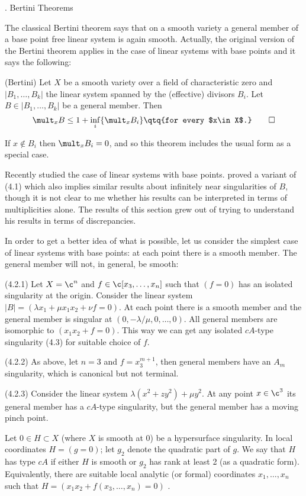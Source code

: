 . Bertini Theorems
\endhead


The classical Bertini theorem says that  on a smooth variety a general
member of a base point free linear system is again smooth.  Actually,  the
original version of the Bertini theorem applies in the case of linear systems
with base points and it says the following:

 (Bertini) Let $X$ be a smooth variety over a field of
characteristic zero and $|B_1,\dots,B_k|$ the linear system spanned by the
(effective) divisors $B_i$. Let $B\in |B_1,\dots,B_k|$ be a general member.
Then  
$$
\mult_xB\leq 1+\inf_i\{\mult_xB_i\}\qtq{for every $x\in X$.}\qed
$$
\endproclaim

If $x\not\in B_i$ then $\mult_xB_i=0$, and so this theorem includes the usual
form as a special case. 

Recently
\cite{Xu94} studied the case of linear systems with base points.
\cite{Xu94} proved a variant of (4.1)  which also  implies similar results about
infinitely near singularities of $B$, though it is not clear to me whether his
results can be interpreted in terms of multiplicities alone. 
The results of this section grew out of trying to understand his results in
terms of discrepancies.

In order to get a better idea of what is possible, let us consider the simplest
case  of linear systems with base points: at each point there is a smooth
member. The general member will not, in general, be smooth:


 (4.2.1) Let $X=\c^n$ and $f\in \c[x_3,\dots,x_n]$
such that    $(f=0)$ has an isolated singularity at
the origin. Consider the linear system $|B|=(\lambda x_1+\mu x_1x_2+
\nu f=0)$. At each point there is a smooth
member and the general member is
singular at 
$(0,-\lambda/\mu,0,\dots,0)$. All general members are isomorphic to 
$(x_1x_2+f=0)$. 
This way we can get any isolated $cA$-type singularity (4.3) for suitable choice
of
 $f$.

(4.2.2) As above, let $n=3$ and $f=x_3^{m+1}$, then general members have an
$A_m$ singularity, which is canonical but not terminal.

(4.2.3)  Consider the linear system $\lambda(x^2+zy^2)+\mu y^2$. At any point
$x\in \c^3$ its general member has a $cA$-type singularity, but the general
member has a moving pinch point. 
\enddemo




 Let $0\in H\subset
X$ (where $X$ is smooth at $0$) be a hypersurface singularity. 
In local coordinates $H=(g=0)$; let $g_2$ denote the quadratic part of $g$.
We say that $H$ has
type  $cA$ if  either $H$ is smooth or $g_2$  has rank at least 2 (as a
quadratic form).
Equivalently, there are
 suitable local analytic (or formal) coordinates 
$x_1,\dots,x_n$ such that $H=(x_1x_2+f(x_3,\dots,x_n)=0)$
\cite{AGV85,I.11.1}.

